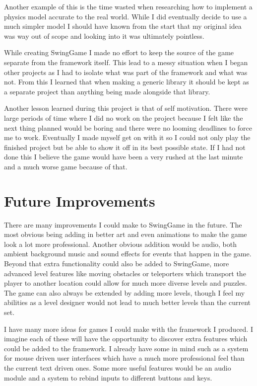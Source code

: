 \documentclass[]{report}
\begin{document}
	Another example of this is the time wasted when researching how to implement a physics model accurate to the real world. While I did eventually decide to use a much simpler model I should have known from the start that my original idea was way out of scope and looking into it was ultimately pointless.
	
	While creating SwingGame I made no effort to keep the source of the game separate from the framework itself. This lead to a messy situation when I began other projects as I had to isolate what was part of the framework and what was not. From this I learned that when making a generic library it should be kept as a separate project than anything being made alongside that library.
	
	Another lesson learned during this project is that of self motivation. There were large periods of time where I did no work on the project because I felt like the next thing planned would be boring and there were no looming deadlines to force me to work. Eventually I made myself get on with it so I could not only play the finished project but be able to show it off in its best possible state. If I had not done this I believe the game would have been a very rushed at the last minute and a much worse game because of that.
	
	\section{Future Improvements}
	There are many improvements I could make to SwingGame in the future. The most obvious being adding in better art and even animations to make the game look a lot more professional. Another obvious addition would be audio, both ambient background music and sound effects for events that happen in the game. Beyond that extra functionality could also be added to SwingGame, more advanced level features like moving obstacles or teleporters which transport the player to another location could allow for much more diverse levels and puzzles. The game can also always be extended by adding more levels, though I feel my abilities as a level designer would not lead to much better levels than the current set.
	
	I have many more ideas for games I could make with the framework I produced. I imagine each of these will have the opportunity to discover extra features which could be added to the framework. I already have some in mind such as a system for mouse driven user interfaces which have a much more professional feel than the current text driven ones. Some more useful features would be an audio module and a system to rebind inputs to different buttons and keys.
	
\end{document}
